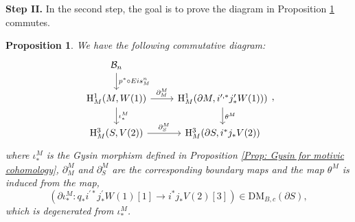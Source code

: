 \documentclass[11pt, a4paper]{amsart}
\theoremstyle{plain}
\newtheorem{proposition}[theorem]{Proposition}
\theoremstyle{definition}
\numberwithin{equation}{section}
\begin{document}
\vspace{10pt}

\noindent \textbf{Step II.} In the second step, the goal is to prove the diagram in Proposition \ref{Prop: mot commutative diagram} commutes. 

\begin{proposition}
\label{Prop: mot commutative diagram}
We have the following commutative diagram:
\[
    \begin{tikzcd}
         \mathcal{B}_{n} \ar[d, "p^{*}\circ Eis_{M}^{n}"] & \\
        \mathrm{H}^{1}_{M}(M,W(1)) \ar[r, "\partial^{M}_{M}"] \ar[d, "{\iota_{*}^{M}}"] & \mathrm{H}^{1}_{M}(\partial{M}, i^{\prime, *}j^{\prime}_{*}W(1))) \ar[d, "{\theta^{M}}"] \\
        \mathrm{H}^{3}_{M}(S, V(2)) \ar[r, "\partial_{S}^{M}"] & \mathrm{H}^{3}_{M}(\partial{S}, i^{*}j_{*}V(2))
    \end{tikzcd}, 
\]
where $\iota_{*}^{M}$ is the Gysin morphism defined in Proposition \ref{Prop: Gysin for motivic cohomology}, $\partial_{M}^{M}$ and $\partial_{S}^{M}$ are the corresponding boundary maps and the map $\theta^{M}$ is induced from the map, 
\begin{equation}
\label{eq: Hodge theta in derived category.}
    (\partial \iota_{*}^{M} \colon q_{*}i^{\prime*}j^{\prime}_{*}W(1)[1] \rightarrow i^{*}j_{*}V(2)[3]) \in \mathrm{DM}_{B,c}(\partial S),
\end{equation}
which is degenerated from $\iota^{M}_{*}$.
\end{proposition}
\end{document}
